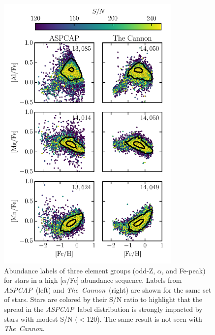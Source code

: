 \documentclass[12pt,preprint]{aastex}
\newcommand{\project}[1]{\textsl{#1}}
\newcommand{\TheCannon}{\project{The~Cannon}}
\newcommand{\acronym}[1]{{\small{#1}}}
\newcommand{\aspcap}{\project{\acronym{ASPCAP}}}
\begin{document}
\begin{figure}[p]
\centering
\includegraphics[width=0.8\textwidth]{high-alpha-sequence.pdf}
\caption{Abundance labels of three element groups (odd-Z, $\alpha$, and Fe-peak) for stars in a high [$\alpha$/Fe] abundance sequence. Labels from \aspcap\ (left) and \TheCannon\ (right) are shown for the same set of stars. Stars are colored by their S/N ratio to highlight that the spread in the \aspcap\ label distribution is strongly impacted by stars with modest S/N ($<120$). The same result is not seen with \TheCannon.\label{fig:high-alpha-sequence}}
\end{figure}

\clearpage
\end{document}
